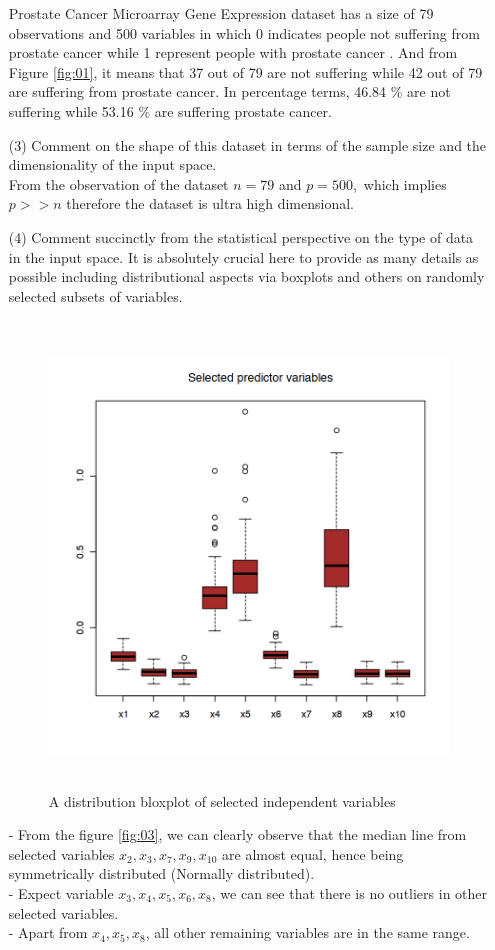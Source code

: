 \documentclass[12pt,a4paper]{article}
\begin{document}
\begin{enumerate}
		Prostate Cancer Microarray Gene Expression  dataset has a size of 79 observations  and 500  variables in which  0 indicates people not suffering from prostate cancer while 1 represent people with prostate cancer . And from Figure \ref{fig:01},  it means that 37 out of 79 are not suffering while 42 out of 79 are suffering from prostate cancer.  In percentage terms,  46.84 \% are not suffering while 53.16 \% are suffering prostate cancer.
		\item[(3)]  Comment on the shape of this dataset in terms of the sample size and the dimensionality of the input space.\\
		From the observation of the dataset $n= 79$ and $p=500,$ which implies  $p>>n$ therefore the dataset is ultra high dimensional.	
			\item[(4)] Comment succinctly from the statistical perspective on the type of data in the input space.  It is absolutely crucial here to provide as many details as possible including distributional aspects via boxplots and others on randomly selected subsets of variables.
			\begin{figure}[!h]
				\includegraphics[width=420pt,height=350pt]{./graphics/q24.png}
				\caption{A distribution  bloxplot of selected independent variables}
				\label{fig:02}
		\end{figure}
		
			- From the figure \ref{fig:03}, we can clearly observe that the median line from selected variables $x_2,x_3,x_7,x_9,x_10$ are almost equal, hence being symmetrically distributed (Normally distributed).\\
			- Expect variable $x_3,x_4,x_5,x_6,x_8$, we can see that there is no outliers in other selected variables.\\
			- Apart from $x_4,x_5,x_8$,  all other remaining variables are in the same range.
\end{enumerate}
\end{document}
